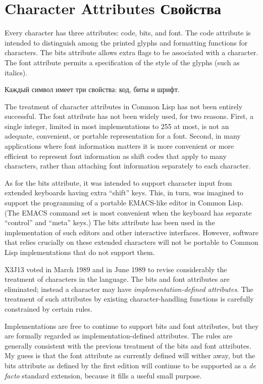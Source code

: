 \section{Character Attributes Свойства }

Every character has three attributes: code, bits, and font.
The code attribute is intended to distinguish among the printed glyphs
and formatting functions for characters.  The bits attribute allows extra
flags to be associated with a character.  The font attribute permits
a specification of the style of the glyphs (such as italics).

Каждый символ имеет три свойства: код, биты и шрифт.


\begin{new}
The treatment of character attributes in Common Lisp has not been
entirely successful.  The font attribute has not been widely used,
for two reasons.  First, a single integer, limited in most
implementations to 255 at most, is not an adequate, convenient, or portable
representation for a font.  Second, in many applications where font
information matters it is more convenient or more efficient to represent
font information as shift codes that apply to many characters, rather than
attaching font information separately to each character.

As for the bits attribute, it was intended to support
character input from extended keyboards having extra ``shift'' keys.
This, in turn, was imagined to support the programming of a portable
EMACS-like editor in Common Lisp.  (The EMACS command set
is most convenient when the keyboard has separate ``control'' and
``meta'' keys.)   The bits attribute has been used in the implementation
of such editors and other interactive interfaces.  However, software
that relies crucially on these extended characters will not be portable
to Common Lisp implementations that do not support them.

X3J13 voted in March 1989 
and in June 1989 
to revise considerably the treatment
of characters in the language.  The bits and font attributes are eliminated;
instead a character may have \emph{implementation-defined attributes}.
The treatment of such attributes by existing character-handling functions
is carefully constrained by certain rules.

Implementations are free to
continue to support bits and font attributes, but they are
formally regarded as implementation-defined attributes.
The rules are generally consistent with the previous
treatment of the bits and font attributes.
My guess is that
the font attribute as currently defined will wither away,
but the bits attribute as defined by the first edition will
continue to be supported as a \emph{de facto} standard extension,
because it fills a useful small purpose.
\end{new}

